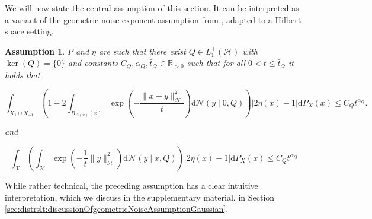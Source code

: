 \documentclass[letterpaper]{article} %
\newcommand{\R}{\mathbb{R}}
\newcommand{\Rp}{\R_{> 0}}
\newcommand{\hs}[1]{\mathcal{#1}} %
\newcommand{\inputSet}{\mathcal{X}} %
\newcommand{\Normal}{\mathcal{N}}
\newtheorem{assumption}[theorem]{Assumption}
\newif\ifTwoColumns
\newif\ifCameraReady
\begin{document}
We will now state the central assumption of this section.
It can be interpreted as a variant of the geometric noise exponent assumption from \cite{steinwart2007fast}, adapted to a Hilbert space setting.
\begin{assumption} \label{assumption:distrslt:geometricNoiseAssumptionGaussian}
$P$ and $\eta$ are such that there exist $Q\in L_1^+(\hs{H})$ with $\ker(Q)=\{0\}$ and constants $C_Q,\alpha_Q,\bar{t}_Q\in\Rp$ such that
for all $0<t\leq \bar{t}_Q$ it holds that
\ifTwoColumns
{\small
\begin{align} \label{eq:assumption:distrslt:geometricNoiseAssumptionGaussian:1}
    & \int_{X_1 \cup X_{-1}} \left(
            1- 2\int_{B_{\Delta(x)}(x)}
            \exp\left(-\frac{\|x-y\|_\hs{H}^2}{t}\right)
            \mathrm{d} \Normal(y\mid 0,Q)
        \right) \nonumber \\
    & \hspace{0.5cm} \times |2\eta(x)-1|\mathrm{d}P_X(x) \leq C_Q t^{\alpha_Q}.
\end{align}
}
\else
\begin{equation} \label{eq:assumption:distrslt:geometricNoiseAssumptionGaussian:1}
    \int_{X_1 \cup X_{-1}} \left(
            1- 2\int_{B_{\Delta(x)}(x)}
            \exp\left(-\frac{\|x-y\|_\hs{H}^2}{t}\right)
            \mathrm{d} \Normal(y\mid 0,Q)
        \right)  |2\eta(x)-1|\mathrm{d}P_X(x)
        \leq C_Q t^{\alpha_Q}.
\end{equation}
\fi
and
\ifTwoColumns
\begin{align} \label{eq:assumption:distrslt:geometricNoiseAssumptionGaussian:2}
    & \int_\inputSet \left(
            \int_\hs{H} \exp\left(-\frac1t \|y\|_\hs{H}^2\right) \mathrm{d} \Normal(y\mid x,Q)
        \right) \nonumber \\
    & \hspace{0.5cm} \times |2\eta(x)-1|\mathrm{d}P_X(x) \leq C_Q t^{\alpha_Q}
\end{align}
\else
\begin{equation} \label{eq:assumption:distrslt:geometricNoiseAssumptionGaussian:2}
    \int_\inputSet \left(
            \int_\hs{H} \exp\left(-\frac1t \|y\|_\hs{H}^2\right) \mathrm{d} \Normal(y\mid x,Q)
        \right)|2\eta(x)-1|\mathrm{d}P_X(x)
    \leq C_Q t^{\alpha_Q}
\end{equation}
\fi
\end{assumption}
While rather technical, the preceding assumption has a clear intuitive interpretation, which we discuss 
\ifCameraReady
in the supplementary material.
\else
in Section \ref{sec:distrslt:discussionOfgeometricNoiseAssumptionGaussian}.
\end{document}
